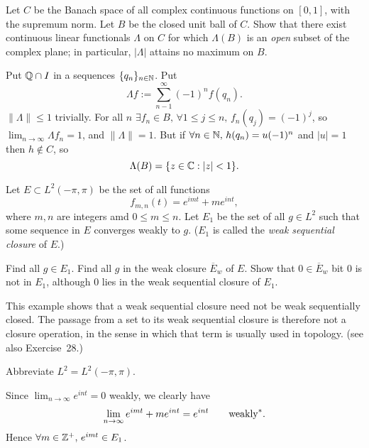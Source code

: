 \begin{enumerate}
\begin{excopy}
Let $C$ be the Banach space of all complex continuous functions on \([0,1]\),
with the supremum norm.
Let $B$ be the closed unit ball of $C$.
Show that there exist continuous linear functionals \(\Lambda\) on $C$
for which \(\Lambda(B)\) is an \emph{open} subset of the
complex plane; in particular, \(|\Lambda|\) attains no maximum on $B$.
\end{excopy}

Put \(\mathbb{Q}\cap I\) in a sequences \(\{q_n\}_{n\in\mathbb{N}}\). Put
\begin{equation*}
\Lambda f := \sum_{n-1}^\infty (-1)^n f(q_n).
\end{equation*}
\(\|\Lambda\| \leq 1\) trivially.
For all $n$ \(\exists f_n \in B,\,\forall 1\leq j\leq n,\, f_n(q_j) = (-1)^j\),
so \(\lim_{n\to\infty} \Lambda f_n = 1\), and \(\|\Lambda\|=1\).
But if \(\forall n\in\mathbb{N},\, h(q_n) = u(-1)^n\) and \(|u|=1\)
then \(h\notin C\), so
\begin{equation*}
\Lambda(B) = \{z\in\mathbb{C}: |z|<1\}.
\end{equation*}

\begin{excopy}
Let  \(E \subset L^2(-\pi,\pi)\) be the set of all functions
\begin{equation*}
f_{m,n}(t) = e^{imt} + me^{int},
\end{equation*}
where \(m,n\) are integers amd \(0\leq m \leq n\). Let \(E_1\) be the set
of all \(g\in L^2\) such that some sequence in $E$ converges weakly to $g$.
(\(E_1\) is called the
\emph{weak sequential closure} of $E$.)
\begin{itemize}
 Find all \(g\in E_1\).
 Find all $g$ in the weak closure \(\overline{E}_w\) of $E$.
Show that \(0\in \overline{E}_w\) bit $0$ is not in \(E_1\),
although $0$ lies in the weak sequential closure of \(E_1\).
\end{itemize}
This example shows that a weak sequential closure need not be
weak sequentially closed. The passage from a set to its weak sequential
closure is therefore not a closure operation, in the sense in which that term
is usually used in topology. (see also Exercise~28.)
\end{excopy}

Abbreviate \(L^2 = L^2(-\pi,\pi)\).
\begin{itemize}
Since
\(\lim_{n\to\infty} e^{int} = 0\) weakly, we
clearly have
\begin{equation*}
\lim_{n\to\infty} e^{imt} + me^{int} = e^{int} \qquad\textnormal{weakly}^*.
\end{equation*}
Hence \(\forall m\in\mathbb{Z}^+,\,e^{imt} \in E_1\).


\end{itemize}
\end{enumerate}
